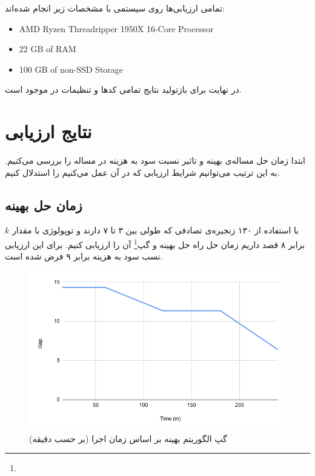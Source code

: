 تمامی ارزیابی‌ها روی سیستمی با مشخصات زیر انجام شده‌اند:

\begin{latin}
    \begin{itemize}
        \item AMD Ryzen Threadripper 1950X 16-Core Processor
        \item 22 GB of RAM
        \item 100 GB of non-SSD Storage
    \end{itemize}
\end{latin}

در نهایت برای بازتولید نتایج تمامی کدها و تنظیمات در \cite{RoadToMSc} موجود است.

\section{نتایج ارزیابی}
ابتدا زمان حل مساله‌ی بهینه و تاثیر نسبت سود به هزینه در مساله را بررسی می‌کنیم.
به این ترتیب می‌توانیم شرایط ارزیابی که در آن عمل می‌کنیم را استدلال کنیم.

\subsection{زمان حل بهینه}
با استفاده از ۱۳۰ زنجیره‌ی تصادفی که طولی بین ۳ تا ۷ دارند
و توپولوژی  با مقدار \(k\) برابر ۸ قصد داریم
زمان حل راه حل بهینه و گپ\footnote{} آن را ارزیابی کنیم. برای این ارزیابی نسب سود به هزینه برابر ۹ فرض شده است.


\begin{figure}[h]
\center\includegraphics[scale=.5]{images/chart-5}
\caption{گپ الگوریتم بهینه بر اساس زمان اجرا (بر حسب دقیقه)}
\label{fig.10}
\end{figure}

